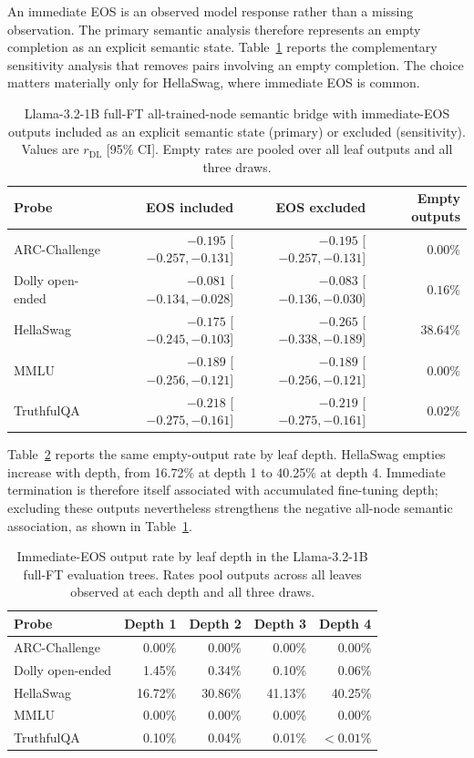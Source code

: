 \documentclass{article}
\theoremstyle{definition}
\theoremstyle{plain}
\begin{document}
An immediate EOS is an observed model response rather than a missing observation. The primary semantic
analysis therefore represents an empty completion as an explicit semantic state. Table~\ref{tab:eos-sensitivity}
reports the complementary sensitivity analysis that removes pairs involving an empty completion. The choice
matters materially only for HellaSwag, where immediate EOS is common.

\begin{table}[h]
\caption{Llama-3.2-1B full-FT all-trained-node semantic bridge with immediate-EOS outputs included as an explicit
  semantic state (primary) or excluded (sensitivity). Values are $r_{\mathrm{DL}}$ [95\% CI]. Empty
  rates are pooled over all leaf outputs and all three draws.}
\label{tab:eos-sensitivity}
\centering
\small
\begin{tabular}{lrrr}
\toprule
Probe & EOS included & EOS excluded & Empty outputs \\
\midrule
ARC-Challenge & $-0.195$ [$-0.257,-0.131$] & $-0.195$ [$-0.257,-0.131$] & $0.00\%$ \\
Dolly open-ended & $-0.081$ [$-0.134,-0.028$] & $-0.083$ [$-0.136,-0.030$] & $0.16\%$ \\
HellaSwag & $-0.175$ [$-0.245,-0.103$] & $-0.265$ [$-0.338,-0.189$] & $38.64\%$ \\
MMLU & $-0.189$ [$-0.256,-0.121$] & $-0.189$ [$-0.256,-0.121$] & $0.00\%$ \\
TruthfulQA & $-0.218$ [$-0.275,-0.161$] & $-0.219$ [$-0.275,-0.161$] & $0.02\%$ \\
\bottomrule
\end{tabular}
\end{table}

Table~\ref{tab:eos-depth} reports the same empty-output rate by leaf depth. HellaSwag empties increase
with depth, from 16.72\% at depth 1 to 40.25\% at depth 4. Immediate termination is therefore itself
associated with accumulated fine-tuning depth; excluding these outputs nevertheless strengthens the
negative all-node semantic association, as shown in Table~\ref{tab:eos-sensitivity}.

\begin{table}[h]
\caption{Immediate-EOS output rate by leaf depth in the Llama-3.2-1B full-FT evaluation trees. Rates
  pool outputs across all leaves observed at each depth and all three draws.}
\label{tab:eos-depth}
\centering
\small
\begin{tabular}{lrrrr}
\toprule
Probe & Depth 1 & Depth 2 & Depth 3 & Depth 4 \\
\midrule
ARC-Challenge & 0.00\% & 0.00\% & 0.00\% & 0.00\% \\
Dolly open-ended & 1.45\% & 0.34\% & 0.10\% & 0.06\% \\
HellaSwag & 16.72\% & 30.86\% & 41.13\% & 40.25\% \\
MMLU & 0.00\% & 0.00\% & 0.00\% & 0.00\% \\
TruthfulQA & 0.10\% & 0.04\% & 0.01\% & $<0.01\%$ \\
\bottomrule
\end{tabular}
\end{table}
\end{document}
